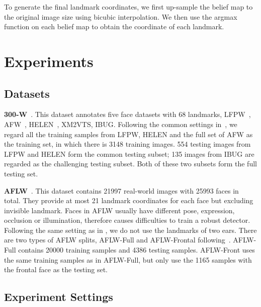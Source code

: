 \documentclass[10pt,twocolumn,letterpaper]{article}
\begin{document}
To generate the final landmark coordinates, we first up-sample the belief map  to the original image size using bicubic interpolation.
We then use the argmax function on each belief map to obtain the coordinate of each landmark.



\section{Experiments}\label{sec:experiment}


\subsection{Datasets}\label{sec:datasets}

\textbf{300-W}~\cite{sagonas2013300}.
This dataset annotates five face datasets with 68 landmarks, LFPW~\cite{belhumeur2013localizing}, AFW~\cite{zhu2012face}, HELEN~\cite{le2012interactive}, XM2VTS, IBUG.
Following the common settings in~\cite{zhu2015face,lv2017deep}, we regard all the training samples from LFPW, HELEN and the full set of AFW as the training set, in which there is 3148 training images.
554 testing images from LFPW and HELEN form the common testing subset; 135 images from IBUG are regarded as the challenging testing subset.
Both of these two subsets form the full testing set.


\textbf{AFLW}~\cite{koestinger2011annotated}.
This dataset contains 21997 real-world images with 25993 faces in total.
They provide at most 21 landmark coordinates for each face but excluding invisible landmark.
Faces in AFLW usually have different pose, expression, occlusion or illumination, therefore causes difficulties to train a robust detector.
Following the same setting as in \cite{lv2017deep,zhu2016unconstrained}, we do not use the landmarks of two ears.
There are two types of AFLW splits, AFLW-Full and AFLW-Frontal following~\cite{zhu2016unconstrained}.
AFLW-Full contains 20000 training samples and 4386 testing samples.
AFLW-Front uses the same training samples as in AFLW-Full, but only use the 1165 samples with the frontal face as the testing set.

\subsection{Experiment Settings}\label{sec:setting}
\end{document}
